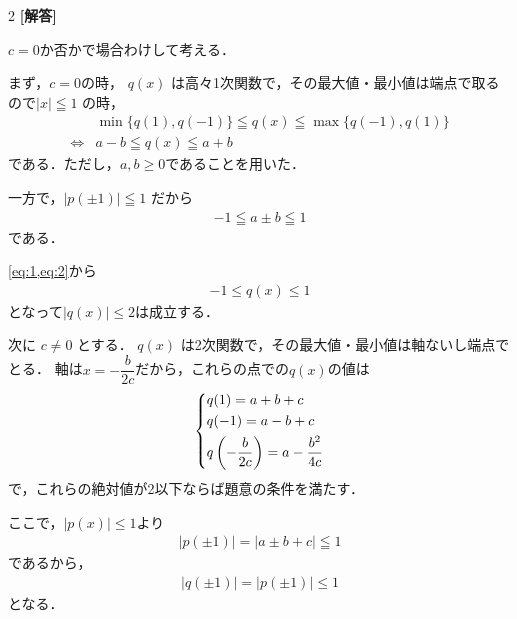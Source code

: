 \documentclass[../../main.tex]{subfiles}
\begin{document}
\setcounter{equation}{0}
\begin{oframed}
  
\end{oframed}
\setlength{\columnseprule}{0.4pt}
\begin{multicols}{2}
  {\bf [解答]}

  $c=0$か否かで場合わけして考える．

  まず，$c=0$の時，
  $q(x)$ は高々1次関数で，その最大値・最小値は端点で取るので$|x| \leqq 1$ の時，
  \begin{align}
    & \min\{q(1), q(-1)\} \leqq q(x) \leqq \max\{q(-1), q(1)\} \\
    \iff
    & a-b \leqq q(x) \leqq a+b \label{eq:1}
  \end{align}
  である．ただし，$a,b \ge 0$であることを用いた．

  一方で，$|p(\pm 1)| \leqq 1$ だから
  \begin{align}
    -1 \leqq a \pm b \leqq 1  \label{eq:2}
  \end{align}
  である．

  \cref{eq:1,eq:2}から
  \begin{align}
    -1 \le q(x) \le 1
  \end{align}
  となって$|q(x)| \le 2$は成立する．

  次に $c \neq 0$ とする．
  $q(x)$ は2次関数で，その最大値・最小値は軸ないし端点でとる．
  軸は$x=-\dfrac{b}{2c}$だから，これらの点での$q(x)$の値は
  \begin{align}
    \begin{dcases}
      q(1) = a+b+c  \\
      q(-1) = a-b+c \\
      q\left(-\dfrac{b}{2c}\right) = a-\dfrac{b^2}{4c}
    \end{dcases}
  \end{align}
  で，これらの絶対値が2以下ならば題意の条件を満たす．

  ここで，$|p(x)| \le 1$より
  \begin{align}
    |p(\pm 1)| = |a \pm b + c| \leqq 1
  \end{align}
  であるから，
  \begin{align}
    |q(\pm 1)| = |p(\pm 1)| \le 1 \label{eq:3}
  \end{align}
  となる．


\end{multicols}
\end{document}
